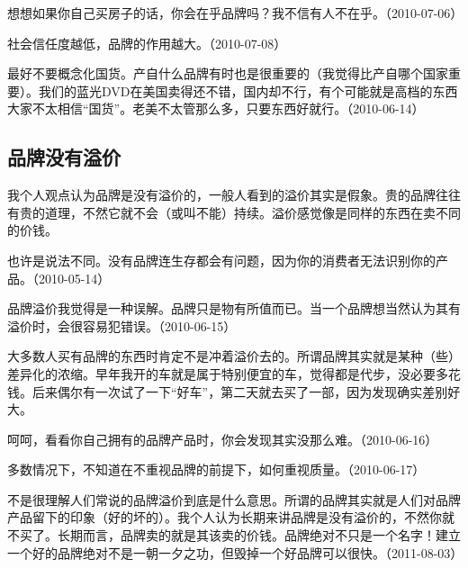 想想如果你自己买房子的话，你会在乎品牌吗？我不信有人不在乎。（2010-07-06）


社会信任度越低，品牌的作用越大。（2010-07-08）


最好不要概念化国货。产自什么品牌有时也是很重要的（我觉得比产自哪个国家重要）。我们的蓝光DVD在美国卖得还不错，国内却不行，有个可能就是高档的东西大家不太相信“国货”。老美不太管那么多，只要东西好就行。（2010-06-14）

\subsection{品牌没有溢价}

我个人观点认为品牌是没有溢价的，一般人看到的溢价其实是假象。贵的品牌往往有贵的道理，不然它就不会（或叫不能）持续。溢价感觉像是同样的东西在卖不同的价钱。


也许是说法不同。没有品牌连生存都会有问题，因为你的消费者无法识别你的产品。（2010-05-14）

品牌溢价我觉得是一种误解。品牌只是物有所值而已。当一个品牌想当然认为其有溢价时，会很容易犯错误。（2010-06-15）


大多数人买有品牌的东西时肯定不是冲着溢价去的。所谓品牌其实就是某种（些）差异化的浓缩。早年我开的车就是属于特别便宜的车，觉得都是代步，没必要多花钱。后来偶尔有一次试了一下“好车”，第二天就去买了一部，因为发现确实差别好大。

呵呵，看看你自己拥有的品牌产品时，你会发现其实没那么难。（2010-06-16）


多数情况下，不知道在不重视品牌的前提下，如何重视质量。（2010-06-17）

不是很理解人们常说的品牌溢价到底是什么意思。所谓的品牌其实就是人们对品牌产品留下的印象（好的坏的）。我个人认为长期来讲品牌是没有溢价的，不然你就不买了。长期而言，品牌卖的就是其该卖的价钱。品牌绝对不只是一个名字！建立一个好的品牌绝对不是一朝一夕之功，但毁掉一个好品牌可以很快。（2011-08-03）

